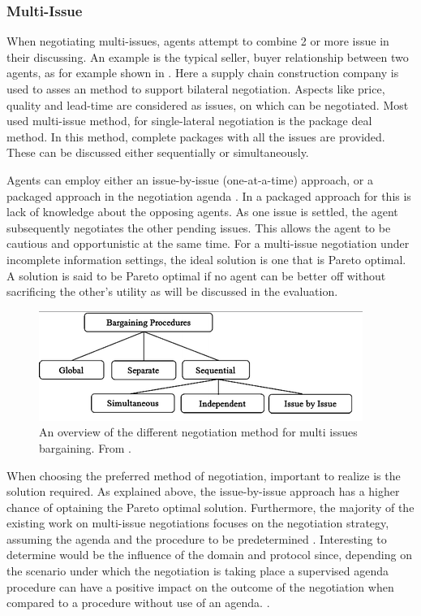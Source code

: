 \subsubsection{Multi-Issue}
 When negotiating multi-issues, agents attempt to combine 2 or more issue in their discussing. An example is the typical seller, buyer relationship between two agents, as for example shown in \citet{schramm2013bilateral}. Here a supply chain construction company is used to asses an method to support bilateral negotiation. Aspects like price, quality and lead-time are considered as issues, on which can be negotiated. Most used multi-issue method, for single-lateral negotiation is the package deal method. In this method, complete packages with all the issues are provided. These can be discussed either sequentially or simultaneously. 

 Agents can employ either an issue-by-issue (one-at-a-time) approach, or a packaged approach in the negotiation agenda \citep{fatima2004agenda}. In \citet{abedin2014agenda} a packaged approach for this is lack of knowledge about the opposing agents. As one issue is settled, the agent subsequently negotiates the other pending issues. This allows the agent to be cautious and opportunistic at the same time. For a multi-issue negotiation under incomplete information settings, the ideal solution is one that is Pareto optimal. A solution is said to be Pareto optimal if no agent can be better off without sacrificing the other’s utility as will be discussed in the evaluation.
 
 \begin{figure}
\centering
\includegraphics[width=0.7\linewidth]{img/multi-lateral}
\caption{An overview of the different negotiation method for multi issues bargaining. From \citep{abedin2014agenda}.}
\label{fig:multi-lateral}
\end{figure}
When choosing the preferred method of negotiation, important to realize is the solution required. As explained above, the issue-by-issue approach has a higher chance of optaining the Pareto optimal solution. Furthermore, the majority of the existing work on multi-issue negotiations focuses on the negotiation strategy, assuming the agenda and the procedure to be predetermined \citep{fatima2004agenda, lai2004literature}. Interesting to determine would be the influence of the domain and protocol since, depending on the scenario under which the negotiation is taking place a supervised agenda procedure can have a positive impact on the outcome of the negotiation when compared to a procedure without use of an agenda. \citep{abedin2014agenda}.


